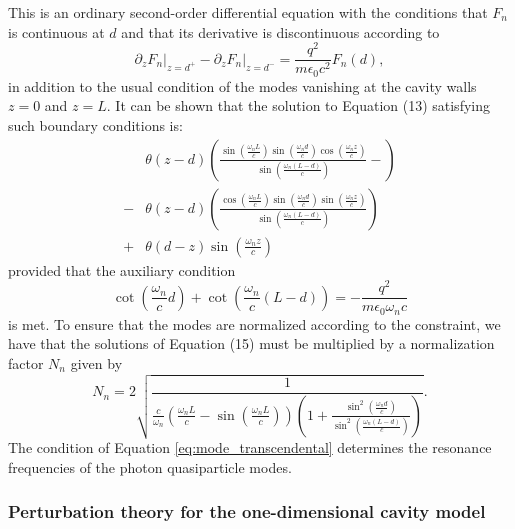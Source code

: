\documentclass[aps,prb,onecolumn,preprint,
	groupedaddress,superscriptaddress,
	amsfonts,amssymb,amsmath,floatfix,
	citeautoscript]{revtex4-1}
\begin{document}
This is an ordinary second-order differential equation with the conditions that $F_n$ is continuous at $d$ and that its derivative is discontinuous according to 
\begin{equation}\label{eq:boundary_condition}
\partial_zF_n\Big|_{z=d^+}-\partial_zF_n\Big|_{z=d^-} = \frac{q^2}{m\epsilon_0 c^2}F_n(d),
\end{equation}
in addition to the usual condition of the modes vanishing at the cavity walls $z=0$ and $z=L$. It can be shown that the solution to Equation (13) satisfying such boundary conditions is:
\begin{align}\label{eq:field_mode}
&\theta (z-d) \left(\frac{\sin\left(\frac{\omega_nL}{c}\right)\sin\left(\frac{\omega_nd}{c}\right)\cos\left(\frac{\omega_nz}{c}\right)}{\sin\left(\frac{\omega_n(L-d)}{c}\right)}-\right) \nonumber \\ 
-&\theta (z-d) \left(\frac{\cos\left(\frac{\omega_nL}{c}\right)\sin\left(\frac{\omega_nd}{c}\right)\sin\left(\frac{\omega_nz}{c}\right)}{\sin\left(\frac{\omega_n(L-d)}{c}\right)}\right) \nonumber \\ 
+&\theta (d-z) \sin\left(\frac{\omega_n z}{c} \right)
\end{align}
provided that the auxiliary condition
\begin{equation}\label{eq:mode_transcendental}
\cot\left(\frac{\omega_n}{c}d \right)+\cot\left(\frac{\omega_n}{c}(L-d) \right) = -\frac{q^2}{m\epsilon_0\omega_nc}
\end{equation}
is met. To ensure that the modes are normalized according to the constraint, we have that the solutions of Equation (15) must be multiplied by a normalization factor $N_n$ given by
\begin{equation}\label{eq:mode_normalization}
N_n = 2\sqrt{\frac{1}{\frac{c}{\omega_n}\left(\frac{\omega_nL}{c}-\sin\left(\frac{\omega_nL}{c}\right) \right)\left(1+\frac{\sin^2\left(\frac{\omega_nd}{c}\right)}{\sin^2\left(\frac{\omega_n(L-d)}{c}\right)} \right)}}.
\end{equation}
The condition of Equation \ref{eq:mode_transcendental} determines the resonance frequencies of the photon quasiparticle modes. 

\subsubsection{Perturbation theory for the one-dimensional cavity model}
\end{document}
